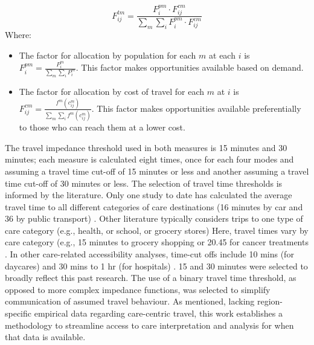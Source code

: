 \documentclass[
  authoryear,
  preprint,
  3p]{elsarticle}
\providecommand{\tightlist}{%
  \setlength{\itemsep}{0pt}\setlength{\parskip}{0pt}}\usepackage{longtable,booktabs,array}
\def\tightlist{}
\begin{document}
\[
F^{tm}_{ij} = \frac{F^{pm}_{i} \cdot F^{cm}_{ij}}{\sum_{m} \sum_{i} F^{pm}_{i} \cdot F^{cm}_{ij}}
\] \noindent Where:

\begin{itemize}
\tightlist
\item
  The factor for allocation by population for each \(m\) at each \(i\)
  is \(F^{pm}_{i} = \frac{P_{i}^m}{\sum_{m}\sum_{i} P_{i}^m}\). This
  factor makes opportunities available based on demand.
\item
  The factor for allocation by cost of travel for each \(m\) at \(i\) is
  \(F_{ij}^{cm} = \frac{f^m(c_{ij}^m)}{\sum_{m} \sum_{i} f^m(c_{ij}^m)}\).
  This factor makes opportunities available preferentially to those who
  can reach them at a lower cost.
\end{itemize}

The travel impedance threshold used in both measures is 15 minutes and
30 minutes; each measure is calculated eight times, once for each four
modes and assuming a travel time cut-off of 15 minutes or less and
another assuming a travel time cut-off of 30 minutes or less. The
selection of travel time thresholds is informed by the literature. Only
one study to date has calculated the average travel time to all
different categories of care destinations (16 minutes by car and 36 by
public transport) \citep{ravensbergenExploratoryAnalysisMobility2022}.
Other literature typically considers trips to one type of care category
(e.g., health, or school, or grocery stores) Here, travel times vary by
care category (e.g., 15 minutes to grocery shopping
\citep{hamrickTimeCostAccess2012} or 20.45 for cancer treatments
\citep{segelRuralurbanDifferencesAssociation2020}. In other care-related
accessibility analyses, time-cut offs include 10 mins (for daycares)
\citep{fransenCommuterbasedTwostepFloating2015} and 30 mins to 1 hr (for
hospitals) \citep{schuurmanDefiningRationalHospital2006}. 15 and 30
minutes were selected to broadly reflect this past research. The use of
a binary travel time threshold, as opposed to more complex impedance
functions, was selected to simplify communication of assumed travel
behaviour. As mentioned, lacking region-specific empirical data
regarding care-centric travel, this work establishes a methodology to
streamline access to care interpretation and analysis for when that data
is available.
\end{document}
